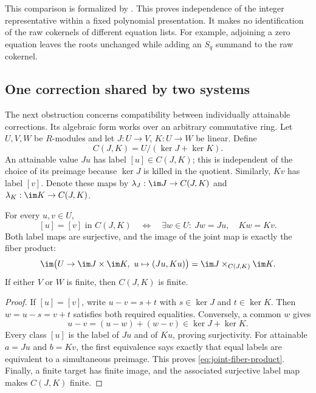This comparison is formalized by
.
This proves independence of the integer representative within a fixed
polynomial presentation. It makes no identification of the raw cokernels
of different equation lists. For example, adjoining a zero equation leaves
the roots unchanged while adding an $S_q$ summand to the raw cokernel.

\subsection{One correction shared by two systems}

The next obstruction concerns compatibility between individually attainable
corrections. Its algebraic form works over an arbitrary commutative ring.
Let $U,V,W$ be $R$-modules and let $J:U\to V$, $K:U\to W$ be linear.
Define
\begin{equation}\label{eq:common-quotient}
 C(J,K)=U/(\ker J+\ker K).
\end{equation}
An attainable value $Ju$ has label $[u]\in C(J,K)$; this is independent of
the choice of its preimage because $\ker J$ is killed in the quotient.
Similarly, $Kv$ has label $[v]$. Denote these maps by
$\lambda_J:\im J\to C(J,K)$ and $\lambda_K:\im K\to C(J,K)$.

\begin{theorem}\label{thm:common-correction}
For every $u,v\in U$,
\begin{equation}\label{eq:common-correction}
 [u]=[v]\text{ in }C(J,K)
 \quad\Longleftrightarrow\quad
 \exists w\in U:\ Jw=Ju,\quad Kw=Kv.
\end{equation}
Both label maps are surjective, and the image of the joint map is exactly
the fiber product:
\begin{equation}\label{eq:joint-fiber-product}
 \im\bigl(U\to\im J\times\im K,\ u\mapsto(Ju,Ku)\bigr)
 =\im J\mathbin{\times}_{C(J,K)}\im K.
\end{equation}
If either $V$ or $W$ is finite, then $C(J,K)$ is finite.
\end{theorem}

\begin{proof}
If $[u]=[v]$, write $u-v=s+t$ with $s\in\ker J$ and $t\in\ker K$.
Then $w=u-s=v+t$ satisfies both required equalities. Conversely, a common
$w$ gives
\[
 u-v=(u-w)+(w-v)\in\ker J+\ker K.
\]
Every class $[u]$ is the label of $Ju$ and of $Ku$, proving surjectivity.
For attainable $a=Ju$ and $b=Kv$, the first equivalence says exactly that
equal labels are equivalent to a simultaneous preimage. This proves
\eqref{eq:joint-fiber-product}. Finally, a finite target has finite image,
and the associated surjective label map makes $C(J,K)$ finite.
\end{proof}

